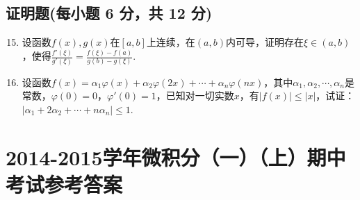 \documentclass[../Main.tex]{subfiles}
\begin{document}
\section{证明题(每小题 6 分，共 12 分)}
\begin{enumerate}
    \setcounter{enumi}{14}
    \item 设函数$f(x),g(x)$在$[a,b]$上连续，在$(a,b)$内可导，证明存在$\xi\in
              (a,b)$，使得$\frac{f'(\xi)}{g'(\xi)}=\frac{f(\xi)-f(a)}{g(b)-g(\xi)}$.
          \vspace{12em}

    \item 设函数$f(x)=\alpha_{1}\varphi(x)+\alpha_{2}\varphi(2x)+\cdots+\alpha
              _{n}\varphi(nx)$，其中$\alpha_{1},\alpha_{2},\cdots,\alpha_{n}$是常数，$\varphi
              (0)=0$，$\varphi'(0)=1$，已知对一切实数$x$，有$|f(x)|\leq |x|$，试证：$|\alpha
              _{1}+2\alpha_{2}+\cdots+n\alpha_{n}|\leq 1$.
          \vspace{12em}
\end{enumerate}

\chapter{2014-2015学年微积分（一）（上）期中考试参考答案}
\end{document}
